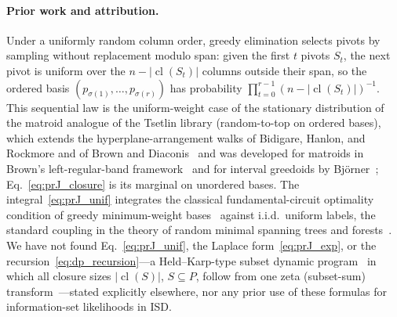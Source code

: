 \documentclass[12pt]{article}
\theoremstyle{definition}
\DeclareMathOperator{\cl}{cl}
\begin{document}
\paragraph{Prior work and attribution.}
Under a uniformly random column order, greedy elimination selects pivots by sampling without replacement modulo
span: given the first $t$ pivots $S_t$, the next pivot is uniform over the $n - |\cl(S_t)|$ columns outside their
span, so the ordered basis $(p_{\sigma(1)}, \dots, p_{\sigma(r)})$ has probability $\prod_{t=0}^{r-1} (n -
|\cl(S_t)|)^{-1}$. This sequential law is the uniform-weight case of the stationary distribution of the matroid
analogue of the Tsetlin library (random-to-top on ordered bases), which extends the hyperplane-arrangement walks of
Bidigare, Hanlon, and Rockmore and of Brown and Diaconis~\cite{BidigareHanlonRockmore1999,BrownDiaconis1998} and was
developed for matroids in Brown's left-regular-band framework~\cite{Brown2000LRB}
and for interval greedoids by Bj\"orner~\cite{Bjorner2008};
Eq.~\eqref{eq:prJ_closure} is its marginal on unordered bases. The integral~\eqref{eq:prJ_unif} integrates the
classical fundamental-circuit optimality condition of greedy minimum-weight
bases~\cite{Kruskal1956,Rado1957,Gale1968,Edmonds1971} against i.i.d.\ uniform labels, the standard coupling in the
theory of random minimal spanning trees and forests~\cite{LyonsPeresSchramm2006}. We have not found
Eq.~\eqref{eq:prJ_unif}, the Laplace form~\eqref{eq:prJ_exp}, or the recursion~\eqref{eq:dp_recursion}---a
Held--Karp-type subset dynamic program~\cite{HeldKarp1962} in which all closure sizes $|\cl(S)|$, $S \subseteq P$,
follow from one zeta (subset-sum) transform~\cite{BjorklundHusfeldtKaskiKoivisto2007}---stated explicitly
elsewhere, nor any prior use of these formulas for information-set likelihoods in ISD.
\end{document}
